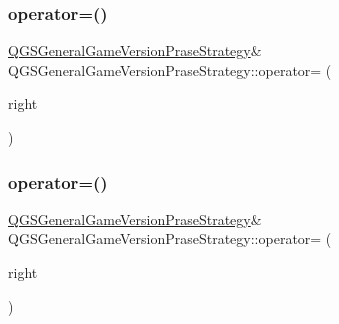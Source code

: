 \subsubsection{\texorpdfstring{operator=()}{operator=()}\hspace{0.1cm}{\footnotesize\ttfamily [1/2]}}
{\footnotesize\ttfamily \mbox{\hyperlink{class_q_g_s_general_game_version_prase_strategy}{Q\+G\+S\+General\+Game\+Version\+Prase\+Strategy}}\& Q\+G\+S\+General\+Game\+Version\+Prase\+Strategy\+::operator= (\begin{DoxyParamCaption}\item[{const \mbox{\hyperlink{class_q_g_s_general_game_version_prase_strategy}{Q\+G\+S\+General\+Game\+Version\+Prase\+Strategy}} \&}]{right }\end{DoxyParamCaption})\hspace{0.3cm}{\ttfamily [default]}}

\mbox{\label{class_q_g_s_general_game_version_prase_strategy_af8a020e08e7385f40cd2e51cfe8e56fc}} 
\subsubsection{\texorpdfstring{operator=()}{operator=()}\hspace{0.1cm}{\footnotesize\ttfamily [2/2]}}
{\footnotesize\ttfamily \mbox{\hyperlink{class_q_g_s_general_game_version_prase_strategy}{Q\+G\+S\+General\+Game\+Version\+Prase\+Strategy}}\& Q\+G\+S\+General\+Game\+Version\+Prase\+Strategy\+::operator= (\begin{DoxyParamCaption}\item[{\mbox{\hyperlink{class_q_g_s_general_game_version_prase_strategy}{Q\+G\+S\+General\+Game\+Version\+Prase\+Strategy}} \&\&}]{right }\end{DoxyParamCaption})\hspace{0.3cm}{\ttfamily [default]}}

\mbox{\label{class_q_g_s_general_game_version_prase_strategy_afaba9ca551dbc6b89ef152bdc194d87d}} 
